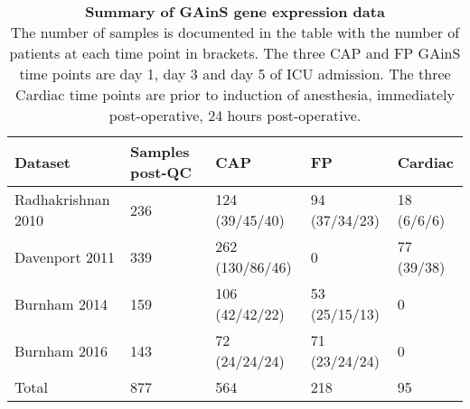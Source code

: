 \begin{table}[]
\begin{tabular}{|l|l|l|l|l|}
\hline
Dataset            & Samples post-QC & CAP             & FP            & Cardiac    \\ \hline
Radhakrishnan 2010 & 236             & 124 (39/45/40)  & 94 (37/34/23) & 18 (6/6/6) \\ \hline
Davenport 2011     & 339             & 262 (130/86/46) & 0             & 77 (39/38) \\ \hline
Burnham 2014       & 159             & 106 (42/42/22)  & 53 (25/15/13) & 0          \\ \hline
Burnham 2016       & 143             & 72 (24/24/24)   & 71 (23/24/24) & 0          \\ \hline
Total              & 877             & 564             & 218           & 95         \\ \hline
\end{tabular}
\medskip
\caption[GAinS samples]{\textbf{Summary of GAinS gene expression data} \\
The number of samples is documented in the table with the number of patients at each time point in brackets. The three CAP and FP GAinS time points are day 1, day 3 and day 5 of ICU admission. The three Cardiac time points are prior to induction of anesthesia, immediately post-operative, 24 hours post-operative.}
\label{tab:GAinS}
\vspace{0.8cm}
\end{table}
